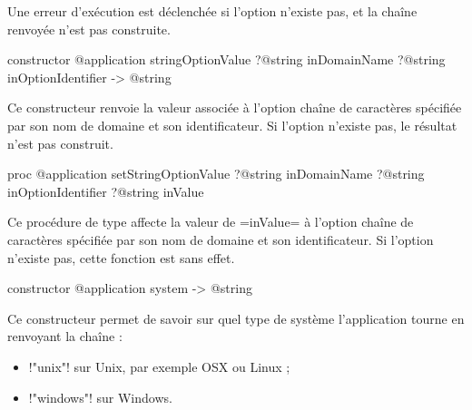 Une erreur d'exécution est déclenchée si l'option n'existe pas, et la chaîne renvoyée n'est pas construite.





\begin{galgasbox}
constructor @application stringOptionValue
    ?@string inDomainName
    ?@string inOptionIdentifier -> @string
\end{galgasbox}

Ce constructeur renvoie la valeur associée à l'option chaîne de caractères spécifiée par son nom de domaine et son identificateur. Si l'option n'existe pas, le résultat n'est pas construit.






\begin{galgasbox}
proc @application setStringOptionValue
    ?@string inDomainName
    ?@string inOptionIdentifier
    ?@string inValue
\end{galgasbox}

Ce procédure de type affecte la valeur de \ggs=inValue= à l'option chaîne de caractères spécifiée par son nom de domaine et son identificateur. Si l'option n'existe pas, cette fonction est sans effet.












\begin{galgasbox}
constructor @application system -> @string
\end{galgasbox}

Ce constructeur permet de savoir sur quel type de système l'application tourne en renvoyant la chaîne :
\begin{itemize}
  \item \ggs!"unix"! sur Unix, par exemple OSX ou Linux ;
  \item \ggs!"windows"! sur Windows.
\end{itemize}










